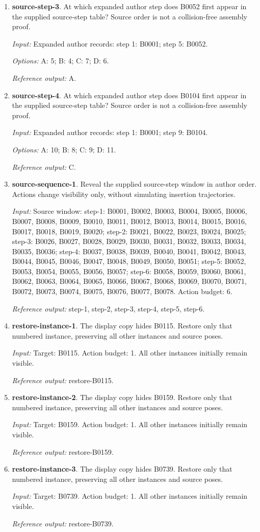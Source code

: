 \begin{enumerate}
\item \textbf{source-step-3}. At which expanded author step does B0052 first appear in the supplied source-step table? Source order is not a collision-free assembly proof.\par {\small \textit{Input:} Expanded author records: step 1: B0001; step 5: B0052. \par\textit{Options:} A: 5; B: 4; C: 7; D: 6. \par\textit{Reference output:} A.}
\item \textbf{source-step-4}. At which expanded author step does B0104 first appear in the supplied source-step table? Source order is not a collision-free assembly proof.\par {\small \textit{Input:} Expanded author records: step 1: B0001; step 9: B0104. \par\textit{Options:} A: 10; B: 8; C: 9; D: 11. \par\textit{Reference output:} C.}
\item \textbf{source-sequence-1}. Reveal the supplied source-step window in author order. Actions change visibility only, without simulating insertion trajectories.\par {\small \textit{Input:} Source window: step-1: B0001, B0002, B0003, B0004, B0005, B0006, B0007, B0008, B0009, B0010, B0011, B0012, B0013, B0014, B0015, B0016, B0017, B0018, B0019, B0020; step-2: B0021, B0022, B0023, B0024, B0025; step-3: B0026, B0027, B0028, B0029, B0030, B0031, B0032, B0033, B0034, B0035, B0036; step-4: B0037, B0038, B0039, B0040, B0041, B0042, B0043, B0044, B0045, B0046, B0047, B0048, B0049, B0050, B0051; step-5: B0052, B0053, B0054, B0055, B0056, B0057; step-6: B0058, B0059, B0060, B0061, B0062, B0063, B0064, B0065, B0066, B0067, B0068, B0069, B0070, B0071, B0072, B0073, B0074, B0075, B0076, B0077, B0078. Action budget: 6. \par\textit{Reference output:} step-1, step-2, step-3, step-4, step-5, step-6.}
\item \textbf{restore-instance-1}. The display copy hides B0115. Restore only that numbered instance, preserving all other instances and source poses.\par {\small \textit{Input:} Target: B0115. Action budget: 1. All other instances initially remain visible. \par\textit{Reference output:} restore-B0115.}
\item \textbf{restore-instance-2}. The display copy hides B0159. Restore only that numbered instance, preserving all other instances and source poses.\par {\small \textit{Input:} Target: B0159. Action budget: 1. All other instances initially remain visible. \par\textit{Reference output:} restore-B0159.}
\item \textbf{restore-instance-3}. The display copy hides B0739. Restore only that numbered instance, preserving all other instances and source poses.\par {\small \textit{Input:} Target: B0739. Action budget: 1. All other instances initially remain visible. \par\textit{Reference output:} restore-B0739.}
\end{enumerate}
\clearpage
